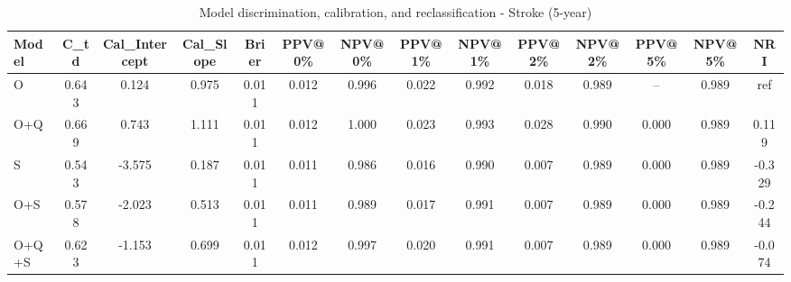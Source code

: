 \begin{table}[htbp]
\centering
\small
\caption{Model discrimination, calibration, and reclassification - Stroke (5-year)}
\label{tab:perf_stroke_5y}
\begin{tabular}{lccccccccccccc}
\toprule
Model & C\_td & Cal\_Intercept & Cal\_Slope & Brier & PPV@0\% & NPV@0\% & PPV@1\% & NPV@1\% & PPV@2\% & NPV@2\% & PPV@5\% & NPV@5\% & NRI \\
\midrule
O & 0.643 & 0.124 & 0.975 & 0.011 & 0.012 & 0.996 & 0.022 & 0.992 & 0.018 & 0.989 & -- & 0.989 & ref \\
O+Q & 0.669 & 0.743 & 1.111 & 0.011 & 0.012 & 1.000 & 0.023 & 0.993 & 0.028 & 0.990 & 0.000 & 0.989 & 0.119 \\
S & 0.543 & -3.575 & 0.187 & 0.011 & 0.011 & 0.986 & 0.016 & 0.990 & 0.007 & 0.989 & 0.000 & 0.989 & -0.329 \\
O+S & 0.578 & -2.023 & 0.513 & 0.011 & 0.011 & 0.989 & 0.017 & 0.991 & 0.007 & 0.989 & 0.000 & 0.989 & -0.244 \\
O+Q+S & 0.623 & -1.153 & 0.699 & 0.011 & 0.012 & 0.997 & 0.020 & 0.991 & 0.007 & 0.989 & 0.000 & 0.989 & -0.074 \\
\bottomrule
\end{tabular}
\end{table}